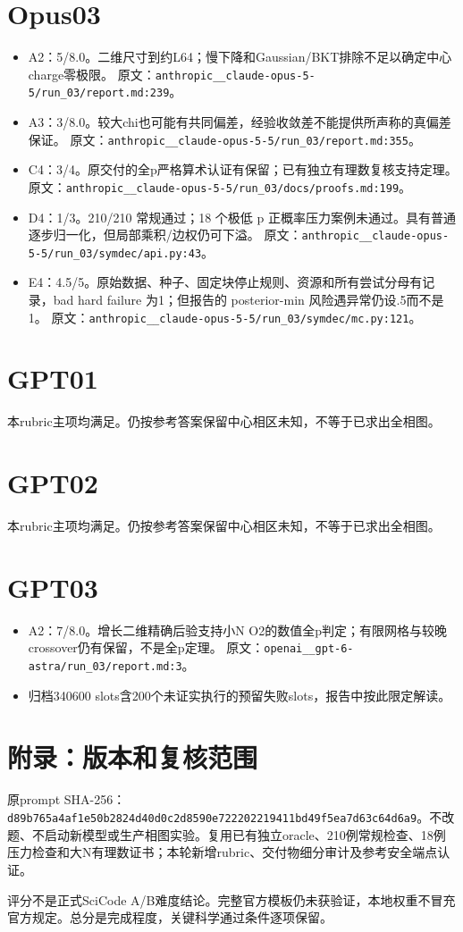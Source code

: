 \documentclass[11pt,a4paper]{article}
\begin{document}
\section*{Opus03}

\begin{itemize}
\item A2：5/8.0。二维尺寸到约L64；慢下降和Gaussian/BKT排除不足以确定中心charge零极限。 原文：\nolinkurl{anthropic__claude-opus-5-5/run_03/report.md:239}。
\item A3：3/8.0。较大chi也可能有共同偏差，经验收敛差不能提供所声称的真偏差保证。 原文：\nolinkurl{anthropic__claude-opus-5-5/run_03/report.md:355}。
\item C4：3/4。原交付的全p严格算术认证有保留；已有独立有理数复核支持定理。 原文：\nolinkurl{anthropic__claude-opus-5-5/run_03/docs/proofs.md:199}。
\item D4：1/3。210/210 常规通过；18 个极低 p 正概率压力案例未通过。具有普通逐步归一化，但局部乘积/边权仍可下溢。 原文：\nolinkurl{anthropic__claude-opus-5-5/run_03/symdec/api.py:43}。
\item E4：4.5/5。原始数据、种子、固定块停止规则、资源和所有尝试分母有记录，bad hard failure 为1；但报告的 posterior-min 风险遇异常仍设.5而不是1。 原文：\nolinkurl{anthropic__claude-opus-5-5/run_03/symdec/mc.py:121}。
\end{itemize}

\section*{GPT01}

本rubric主项均满足。仍按参考答案保留中心相区未知，不等于已求出全相图。


\section*{GPT02}

本rubric主项均满足。仍按参考答案保留中心相区未知，不等于已求出全相图。


\section*{GPT03}

\begin{itemize}
\item A2：7/8.0。增长二维精确后验支持小N O2的数值全p判定；有限网格与较晚crossover仍有保留，不是全p定理。 原文：\nolinkurl{openai__gpt-6-astra/run_03/report.md:3}。
\item 归档340600 slots含200个未证实执行的预留失败slots，报告中按此限定解读。
\end{itemize}

\section*{附录：版本和复核范围}

原prompt SHA-256：\nolinkurl{d89b765a4af1e50b2824d40d0c2d8590e722202219411bd49f5ea7d63c64d6a9}。不改题、不启动新模型或生产相图实验。复用已有独立oracle、210例常规检查、18例压力检查和大N有理数证书；本轮新增rubric、交付物细分审计及参考安全端点认证。

评分不是正式SciCode A/B难度结论。完整官方模板仍未获验证，本地权重不冒充官方规定。总分是完成程度，关键科学通过条件逐项保留。
\end{document}
